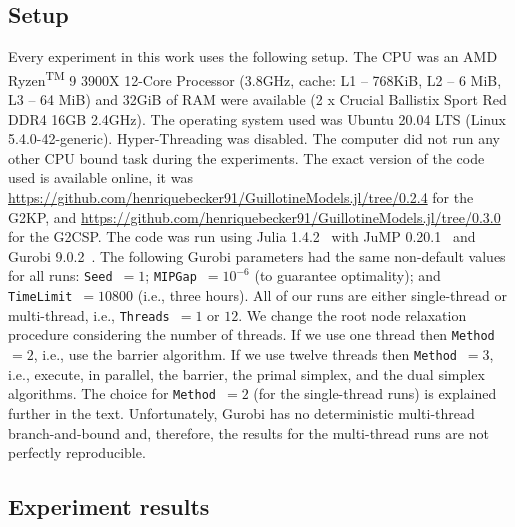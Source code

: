 \documentclass[9pt]{entcs}
\begin{document}
\subsection{Setup}
\label{sec:setup}

Every experiment in this work uses the following setup.
The CPU was an AMD\textsuperscript{\textregistered} Ryzen\textsuperscript{TM} 9 3900X 12-Core Processor (3.8GHz, cache: L1 -- 768KiB, L2 -- 6 MiB, L3 -- 64 MiB) and 32GiB of RAM were available (2 x Crucial Ballistix Sport Red DDR4 16GB 2.4GHz).
The operating system used was Ubuntu 20.04 LTS (Linux 5.4.0-42-generic).
Hyper-Threading was disabled.
The computer did not run any other CPU bound task during the experiments.
The exact version of the code used is available online, it was \url{https://github.com/henriquebecker91/GuillotineModels.jl/tree/0.2.4} for the G2KP, and \url{https://github.com/henriquebecker91/GuillotineModels.jl/tree/0.3.0} for the G2CSP.
The code was run using Julia 1.4.2~\cite{julia} with JuMP 0.20.1~\cite{JuMP} and Gurobi 9.0.2~\cite{gurobi}.
The following Gurobi parameters had the same non-default values for all runs: \verb+Seed+~\(= 1\); \verb+MIPGap+~\(= 10^{-6}\) (to guarantee optimality); and \verb+TimeLimit+~\(= 10800\) (i.e., three hours).
All of our runs are either single-thread or multi-thread, i.e., \verb+Threads+~\(= 1\) or \(12\).
We change the root node relaxation procedure considering the number of threads.
If we use one thread then \verb+Method+~\(= 2\), i.e., use the barrier algorithm.
If we use twelve threads then \verb+Method+~\(= 3\), i.e., execute, in parallel, the barrier, the primal simplex, and the dual simplex algorithms.
The choice for \verb+Method+~\(= 2\) (for the single-thread runs) is explained further in the text.
Unfortunately, Gurobi has no deterministic multi-thread branch-and-bound and, therefore, the results for the multi-thread runs are not perfectly reproducible.

\subsection{Experiment results}
\end{document}
